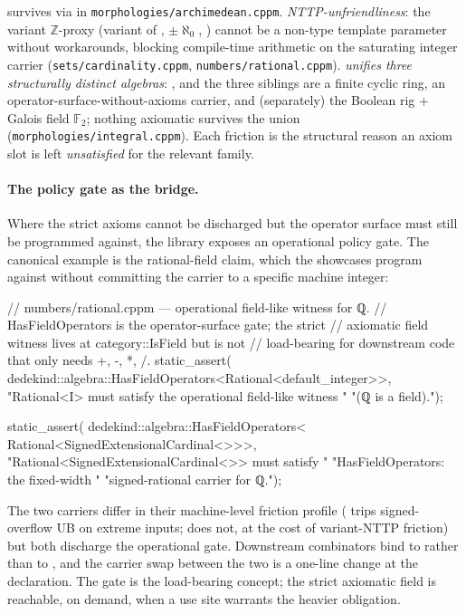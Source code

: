 \documentclass[11pt, a4paper]{article}
\begin{document}
survives via  in
\texttt{morphologies/archimedean.cppm}.
\emph{ NTTP-unfriendliness}: the variant
$\mathbb{Z}$-proxy  (variant of
, $\pm\aleph_0$,
) cannot be a non-type template parameter without
workarounds, blocking compile-time arithmetic on the saturating
integer carrier (\texttt{sets/cardinality.cppm},
\texttt{numbers/rational.cppm}).
\emph{ unifies three structurally distinct algebras}:
,
and the three siblings are a finite cyclic ring, an
operator-surface-without-axioms carrier, and (separately) the
Boolean rig + Galois field $\mathbb{F}_2$; nothing axiomatic
survives the union (\texttt{morphologies/integral.cppm}). Each friction
is the structural reason an axiom slot is left
\emph{unsatisfied} for the relevant family.

\paragraph{The policy gate as the bridge.}
Where the strict axioms cannot be discharged but the operator surface
must still be programmed against, the library exposes an operational
policy gate. The canonical example is the rational-field claim,
which the showcases program against without committing the carrier
to a specific machine integer:
%
\begin{cpp}
// numbers/rational.cppm --- operational field-like witness for ℚ.
// HasFieldOperators is the operator-surface gate; the strict
// axiomatic field witness lives at category::IsField but is not
// load-bearing for downstream code that only needs +, -, *, /.
static_assert(
    dedekind::algebra::HasFieldOperators<Rational<default_integer>>,
    "Rational<I> must satisfy the operational field-like witness "
    "(ℚ is a field).");

static_assert(
    dedekind::algebra::HasFieldOperators<
        Rational<SignedExtensionalCardinal<>>>,
    "Rational<SignedExtensionalCardinal<>> must satisfy "
    "HasFieldOperators: the fixed-width "
    "signed-rational carrier for ℚ.");
\end{cpp}
%
The two carriers differ in their machine-level friction profile
( trips signed-overflow UB on extreme
inputs;  does not, at the
cost of variant-NTTP friction) but both discharge the operational
gate. Downstream combinators bind to 
rather than to , and the carrier swap
between the two is a one-line change at the 
declaration. The gate is the load-bearing concept; the strict
axiomatic field is reachable, on demand, when a use site warrants
the heavier obligation.
\end{document}
